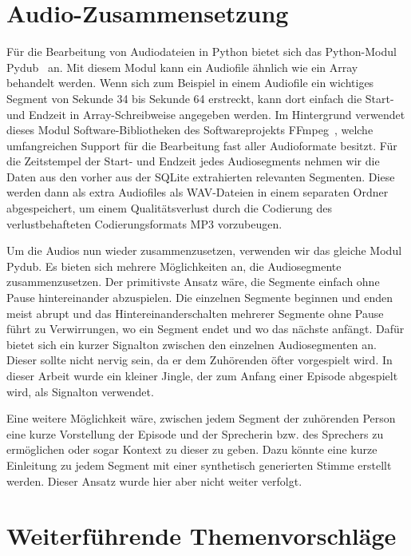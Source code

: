 \section{Audio-Zusammensetzung}

Für die Bearbeitung von Audiodateien in Python bietet sich das Python-Modul Pydub~\cite{zotero-567} an.
Mit diesem Modul kann ein Audiofile ähnlich wie ein Array behandelt werden.
Wenn sich zum Beispiel in einem Audiofile ein wichtiges Segment von Sekunde 34 bis Sekunde 64 erstreckt, kann dort einfach die Start- und Endzeit in Array-Schreibweise angegeben werden.
Im Hintergrund verwendet dieses Modul Software-Bibliotheken des Softwareprojekts FFmpeg~\cite{ffmpeg}, welche umfangreichen Support für die Bearbeitung fast aller Audioformate besitzt.
Für die Zeitstempel der Start- und Endzeit jedes Audiosegments nehmen wir die Daten aus den vorher aus der SQLite extrahierten relevanten Segmenten.
Diese werden dann als extra Audiofiles als WAV-Dateien in einem separaten Ordner abgespeichert, um einem Qualitätsverlust durch die Codierung des verlustbehafteten Codierungsformats MP3 vorzubeugen.

Um die Audios nun wieder zusammenzusetzen, verwenden wir das gleiche Modul Pydub.
Es bieten sich mehrere Möglichkeiten an, die Audiosegmente zusammenzusetzen.
Der primitivste Ansatz wäre, die Segmente einfach ohne Pause hintereinander abzuspielen.
Die einzelnen Segmente beginnen und enden meist abrupt und das Hintereinanderschalten mehrerer Segmente ohne Pause führt zu Verwirrungen, wo ein Segment endet und wo das nächste anfängt.
Dafür bietet sich ein kurzer Signalton zwischen den einzelnen Audiosegmenten an.
Dieser sollte nicht nervig sein, da er dem Zuhörenden öfter vorgespielt wird.
In dieser Arbeit wurde ein kleiner Jingle, der zum Anfang einer Episode abgespielt wird, als Signalton verwendet.

Eine weitere Möglichkeit wäre, zwischen jedem Segment der zuhörenden Person eine kurze Vorstellung der Episode und der Sprecherin bzw. des Sprechers zu ermöglichen oder sogar Kontext zu dieser zu geben.
Dazu könnte eine kurze Einleitung zu jedem Segment mit einer synthetisch generierten Stimme erstellt werden.
Dieser Ansatz wurde hier aber nicht weiter verfolgt.

\section{Weiterführende Themenvorschläge}

